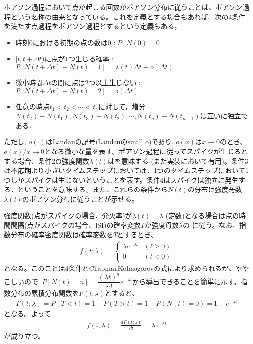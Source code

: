 \documentclass[letterpaper,10pt,english]{sphinxmanual}
\begin{document}
ポアソン過程において点が起こる回数がポアソン分布に従うことは、ポアソン過程という名称の由来となっている。これを定義とする場合もあれば、次の4条件を満たす点過程をポアソン過程とするという定義もある。
\begin{itemize}
\item {} 
時刻0における初期の点の数は0 : \(P[N(0)=0]=1\)

\item {} 
\([t, t+\Delta t)\)に点が1つ生じる確率 : \(P[N(t+\Delta t)-N(t)=1]=\lambda(t)\Delta t+o(\Delta t)\)

\item {} 
微小時間\(\Delta t\)の間に点は2つ以上生じない : \(P[N(t+\Delta t)-N(t)=2]=o(\Delta t)\)

\item {} 
任意の時点\(t_1 < t_2 < \cdots< t_n\)に対して，増分 \(N(t_2)-N(t_1), N(t_3)-N(t_2), \cdots, N(t_n)-N(t_{n−1})\)は互いに独立である．

\end{itemize}

ただし, \(o(\cdot)\)はLandauの記号(Landauのsmall o)であり, \(o(x)\)は\(x\to 0\)のとき、\(o(x)/x\to 0\)となる微小な量を表す。ポアソン過程に従ってスパイクが生じるとする場合、条件2の強度関数\(\lambda(t)\)はを意味する (また実装において有用)。条件3は不応期より小さいタイムステップにおいては、1つのタイムステップにおいて1つしかスパイクは生じないということを表す。条件4はスパイクは独立に発生する、ということを意味する。また、これらの条件から\(N(t)\)の分布は強度母数\(\lambda(t)\)のポアソン分布に従うことが示せる。

強度関数(点がスパイクの場合、発火率)が\(\lambda(t)=\lambda\) (定数)となる場合は点の時間間隔(点がスパイクの場合、ISI)の確率変数\(T\)が強度母数\(\lambda\)の に従う。なお、指数分布の確率密度関数は確率変数を\(T\)とするとき、
\begin{equation*}
\begin{split}
f(t;\lambda )=\left\{{\begin{array}{ll}\lambda e^{-\lambda t}&(t\geq 0)\\0&(t<0)\end{array}}\right.
\end{split}
\end{equation*}
となる。このことは4条件とChapman\sphinxhyphen{}Kolmogorovの式により求められるが、ややこしいので, \(P[N(t)=n]=\dfrac{(\lambda t)^{n}}{n !} e^{-\lambda t}\)から導出できることを簡単に示す。指数分布の累積分布関数を\(F(t; \lambda)\)とすると、
\begin{equation*}
\begin{split}
F(t; \lambda) = P(T<t)=1-P(T>t)=1-P(N(t)=0)=1-e^{-\lambda t}
\end{split}
\end{equation*}
となる。よって
\begin{equation*}
\begin{split}
f(t; \lambda)=\frac{dF(t; \lambda)}{dt}=\lambda e^{-\lambda t}
\end{split}
\end{equation*}
が成り立つ。
\end{document}
